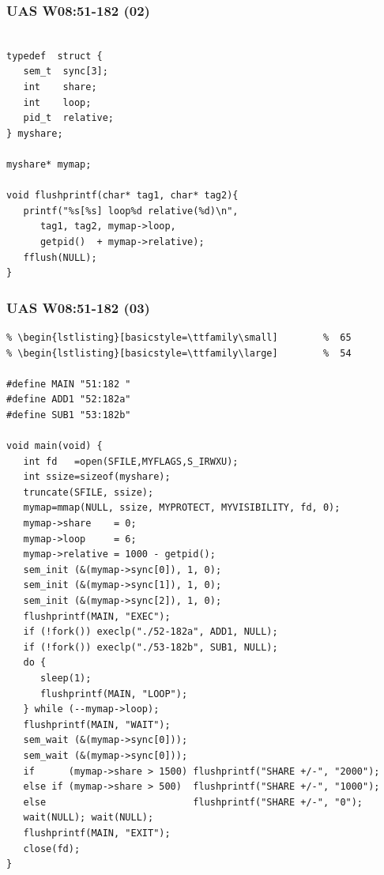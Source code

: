 \documentclass[xcolor=table, notheorems, hyperref={pdfpagelabels=false}]{beamer}
\begin{document}
\begin{frame}[fragile]
\frametitle{UAS W08:51-182 (02)}
\begin{lstlisting}[basicstyle=\ttfamily\large]        %  54

typedef  struct {
   sem_t  sync[3];
   int    share;
   int    loop;
   pid_t  relative;
} myshare;

myshare* mymap;

void flushprintf(char* tag1, char* tag2){
   printf("%s[%s] loop%d relative(%d)\n", 
      tag1, tag2, mymap->loop, 
      getpid()  + mymap->relative);
   fflush(NULL);
}

\end{lstlisting}
\end{frame}

\begin{frame}[fragile]
\frametitle{UAS W08:51-182 (03)}
\begin{lstlisting}[basicstyle=\ttfamily\tiny]         % 108
% \begin{lstlisting}[basicstyle=\ttfamily\footnotesize] %  72
% \begin{lstlisting}[basicstyle=\ttfamily\small]        %  65
% \begin{lstlisting}[basicstyle=\ttfamily\large]        %  54

#define MAIN "51:182 "
#define ADD1 "52:182a"
#define SUB1 "53:182b"

void main(void) {
   int fd   =open(SFILE,MYFLAGS,S_IRWXU);
   int ssize=sizeof(myshare);
   truncate(SFILE, ssize);
   mymap=mmap(NULL, ssize, MYPROTECT, MYVISIBILITY, fd, 0);
   mymap->share    = 0;
   mymap->loop     = 6;
   mymap->relative = 1000 - getpid();
   sem_init (&(mymap->sync[0]), 1, 0);
   sem_init (&(mymap->sync[1]), 1, 0);
   sem_init (&(mymap->sync[2]), 1, 0);
   flushprintf(MAIN, "EXEC");
   if (!fork()) execlp("./52-182a", ADD1, NULL);
   if (!fork()) execlp("./53-182b", SUB1, NULL);
   do {
      sleep(1);
      flushprintf(MAIN, "LOOP");
   } while (--mymap->loop);
   flushprintf(MAIN, "WAIT");
   sem_wait (&(mymap->sync[0]));
   sem_wait (&(mymap->sync[0]));
   if      (mymap->share > 1500) flushprintf("SHARE +/-", "2000");
   else if (mymap->share > 500)  flushprintf("SHARE +/-", "1000");
   else                          flushprintf("SHARE +/-", "0");
   wait(NULL); wait(NULL);
   flushprintf(MAIN, "EXIT");
   close(fd);
}

\end{lstlisting}
\end{frame}
\end{document}
